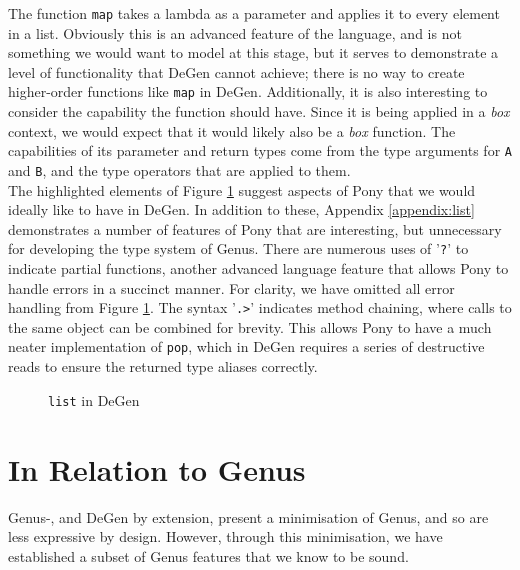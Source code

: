The function \texttt{map} takes a lambda as a parameter and applies it to every element in a list.  Obviously this is an advanced feature of the language, and is not something we would want to model at this stage, but it serves to demonstrate a level of functionality that DeGen cannot achieve; there is no way to create higher-order functions like \texttt{map} in DeGen. Additionally, it is also interesting to consider the capability the function should have. Since it is being applied in a \textit{box} context, we would expect that it would likely also be a \textit{box} function. The capabilities of its parameter and return types come from the type arguments for \texttt{A} and \texttt{B}, and the type operators that are applied to them. \\

The highlighted elements of Figure \ref{fig:degen-list} suggest aspects of Pony that we would ideally like to have in DeGen. In addition to these, Appendix \ref{appendix:list} demonstrates a number of features of Pony that are interesting, but unnecessary for developing the type system of Genus. There are numerous uses of '\texttt{?}' to indicate partial functions, another advanced language feature that allows Pony to handle errors in a succinct manner. For clarity, we have omitted all error handling from Figure \ref{fig:degen-list}. The syntax '\texttt{.>}' indicates method chaining, where calls to the same object can be combined for brevity. This allows Pony to have a much neater implementation of \texttt{pop}, which in DeGen requires a series of destructive reads to ensure the returned type aliases correctly.

\begin{figure}
    \centering
    
    \caption{\texttt{list} in DeGen}
    \label{fig:degen-list}
\end{figure}




\section{In Relation to Genus} 

Genus-, and DeGen by extension, present a minimisation of Genus, and so are less expressive by design. However, through this minimisation, we have established a subset of Genus features that we know to be sound.

